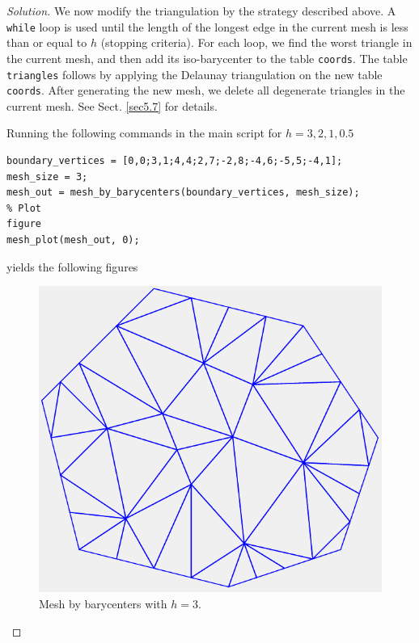 \documentclass[11pt,a4paper,center,notitlepage]{article}
\numberwithin{equation}{section}
\begin{document}
\begin{proof}[Solution]
We now modify the triangulation by the strategy described above. A \texttt{while} loop is used until the length of the longest edge in the current mesh is less than or equal to $h$ (stopping criteria). For each loop, we find the worst triangle in the current mesh, and then add its iso-barycenter to the table \verb|coords|. The table \verb|triangles| follows by applying the Delaunay triangulation on the new table \verb|coords|. After generating the new mesh, we delete all degenerate triangles in the current mesh. See Sect. \ref{sec5.7} for details.

Running the following commands in the main script for $h = 3, 2, 1, 0.5$
\begin{verbatim}
boundary_vertices = [0,0;3,1;4,4;2,7;-2,8;-4,6;-5,5;-4,1];
mesh_size = 3;
mesh_out = mesh_by_barycenters(boundary_vertices, mesh_size);
% Plot
figure
mesh_plot(mesh_out, 0);
\end{verbatim}
yields the following figures
\begin{figure}[H]
\centering
\includegraphics[scale=0.9]{mesh_by_barycenter_3}
\caption{Mesh by barycenters with $h=3$.}
\end{figure}


\end{proof}
\end{document}
